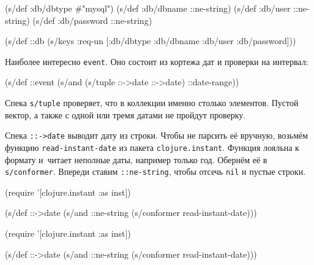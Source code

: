\begin{english}
  \begin{clojure}
(s/def :db/dbtype   #{"mysql"})
(s/def :db/dbname   ::ne-string)
(s/def :db/user     ::ne-string)
(s/def :db/password ::ne-string)

(s/def ::db
  (s/keys :req-un [:db/dbtype
                   :db/dbname
                   :db/user
                   :db/password]))
  \end{clojure}
\end{english}

Наиболее интересно \verb|event|. Оно состоит из кортежа дат и проверки на
интервал:

\begin{english}
  \begin{clojure}
(s/def ::event
  (s/and (s/tuple ::->date ::->date)
         ::date-range))
  \end{clojure}
\end{english}


Спека \verb|s/tuple| проверяет, что в коллекции именно столько элементов. Пустой
вектор, а также с одной или тремя датами не пройдут проверку.

Спека \verb|::->date| выводит дату из строки. Чтобы не парсить её вручную,
возьмём функцию \verb|read-instant-date| из пакета \verb|clojure.instant|.
Функция лояльна к формату и~читает неполные даты, например только год.  Обернём
её в \verb|s/conformer|. Впереди ставим \verb|::ne-string|, чтобы отсечь
\verb|nil| и пустые строки.


\ifnarrow

\begin{english}
  \begin{clojure}
(require '[clojure.instant :as inst])

(s/def ::->date
  (s/and ::ne-string
    (s/conformer read-instant-date)))
  \end{clojure}
\end{english}

\else

\begin{english}
  \begin{clojure}
(require '[clojure.instant :as inst])

(s/def ::->date
  (s/and ::ne-string (s/conformer read-instant-date)))
  \end{clojure}
\end{english}

